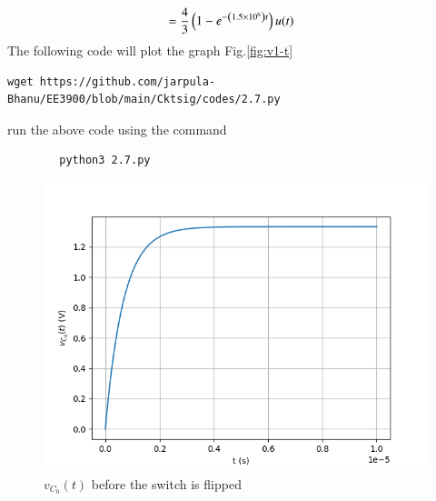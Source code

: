\documentclass[journal,12pt,twocolumn]{IEEEtran}
\renewcommand\thesection{\arabic{section}}
\begin{document}
\begin{enumerate}[label=\arabic*.,ref=\thesection.\theenumi]
\begin{align}
        &= \frac{4}{3}\left(1 - e^{-\left(1.5 \times 10^6\right)t}\right)u(t)
    \end{align}
    The following code will plot the graph Fig.\eqref{fig:v1-t}
    \begin{lstlisting}
wget https://github.com/jarpula-Bhanu/EE3900/blob/main/Cktsig/codes/2.7.py
    \end{lstlisting}
        run the above code using the command
        \begin{lstlisting}
        python3 2.7.py
        \end{lstlisting}
    \begin{figure}[!ht]
        \includegraphics[width=\columnwidth]{./figs/2.7.png}
        \caption{$v_{C_0}(t)$ before the switch is flipped}
        \label{fig:v1-t}
    \end{figure}


\end{enumerate}
\end{document}
